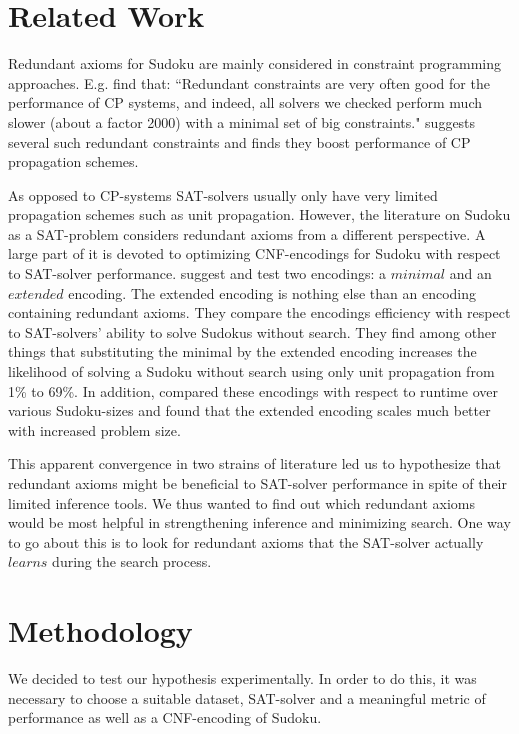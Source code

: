 \documentclass{article}
\begin{document}
\section{Related Work} \label{related work}

Redundant axioms for Sudoku are mainly considered in constraint programming approaches. E.g.  find that: ``Redundant constraints are very often good for the performance of CP systems,
and indeed, all solvers we checked perform much slower (about a factor 2000) with
a minimal set of big constraints."  suggests several such redundant constraints and finds they boost performance of CP propagation schemes.

As opposed to CP-systems SAT-solvers usually only have very limited propagation schemes such as unit propagation. However, the literature on Sudoku as a SAT-problem considers redundant axioms from a different perspective. A large part of it is devoted to optimizing CNF-encodings for Sudoku with respect to SAT-solver performance.  suggest and test two encodings: a $minimal$ and an $extended$ encoding. The extended encoding is nothing else than an encoding containing redundant axioms. They compare the encodings efficiency
with respect to SAT-solvers' ability to solve Sudokus without search. They find among other things that substituting the minimal by the extended encoding increases the likelihood of solving a Sudoku without search using only unit propagation from 1\% to 69\%. In addition,  compared these encodings with respect to runtime over various Sudoku-sizes and found that the extended encoding scales much better with increased problem size.

This apparent convergence in two strains of literature led us to hypothesize that redundant axioms might be beneficial to SAT-solver performance in spite of their limited inference tools. We thus wanted to find out which redundant axioms would be most helpful in strengthening inference and minimizing search. One way to go about this is to look for redundant axioms that the SAT-solver actually $learns$ during the search process.



\section{Methodology} \label{methods}

We decided to test our hypothesis experimentally. In order to do this, it was necessary to choose a suitable dataset, SAT-solver and a meaningful metric of performance as well as a CNF-encoding of Sudoku.
\end{document}

